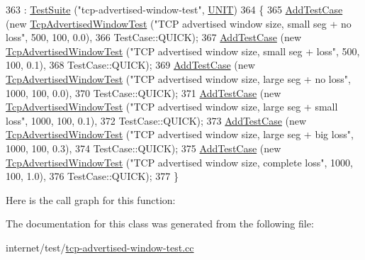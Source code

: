 \begin{DoxyCode}
363                                   : \hyperlink{classns3_1_1TestSuite_a904b0c40583b744d30908aeb94636d1a}{TestSuite} (\textcolor{stringliteral}{"tcp-advertised-window-test"}, 
      \hyperlink{classns3_1_1TestSuite_a1ebfcab34ec8161e085e8e3a1855eae0a3885375a3787abf60431f8454b3cadbd}{UNIT})
364   \{
365     \hyperlink{classns3_1_1TestCase_a3718088e3eefd5d6454569d2e0ddd835}{AddTestCase} (\textcolor{keyword}{new} \hyperlink{classTcpAdvertisedWindowTest}{TcpAdvertisedWindowTest} (\textcolor{stringliteral}{"TCP advertised window
       size, small seg + no loss"}, 500, 100, 0.0),
366                  TestCase::QUICK);
367     \hyperlink{classns3_1_1TestCase_a3718088e3eefd5d6454569d2e0ddd835}{AddTestCase} (\textcolor{keyword}{new} \hyperlink{classTcpAdvertisedWindowTest}{TcpAdvertisedWindowTest} (\textcolor{stringliteral}{"TCP advertised window
       size, small seg + loss"}, 500, 100, 0.1),
368                  TestCase::QUICK);
369     \hyperlink{classns3_1_1TestCase_a3718088e3eefd5d6454569d2e0ddd835}{AddTestCase} (\textcolor{keyword}{new} \hyperlink{classTcpAdvertisedWindowTest}{TcpAdvertisedWindowTest} (\textcolor{stringliteral}{"TCP advertised window
       size, large seg + no loss"}, 1000, 100, 0.0),
370                  TestCase::QUICK);
371     \hyperlink{classns3_1_1TestCase_a3718088e3eefd5d6454569d2e0ddd835}{AddTestCase} (\textcolor{keyword}{new} \hyperlink{classTcpAdvertisedWindowTest}{TcpAdvertisedWindowTest} (\textcolor{stringliteral}{"TCP advertised window
       size, large seg + small loss"}, 1000, 100, 0.1),
372                  TestCase::QUICK);
373     \hyperlink{classns3_1_1TestCase_a3718088e3eefd5d6454569d2e0ddd835}{AddTestCase} (\textcolor{keyword}{new} \hyperlink{classTcpAdvertisedWindowTest}{TcpAdvertisedWindowTest} (\textcolor{stringliteral}{"TCP advertised window
       size, large seg + big loss"}, 1000, 100, 0.3),
374                  TestCase::QUICK);
375     \hyperlink{classns3_1_1TestCase_a3718088e3eefd5d6454569d2e0ddd835}{AddTestCase} (\textcolor{keyword}{new} \hyperlink{classTcpAdvertisedWindowTest}{TcpAdvertisedWindowTest} (\textcolor{stringliteral}{"TCP advertised window
       size, complete loss"}, 1000, 100, 1.0),
376                  TestCase::QUICK);
377   \}
\end{DoxyCode}


Here is the call graph for this function\+:




The documentation for this class was generated from the following file\+:\begin{DoxyCompactItemize}
\item 
internet/test/\hyperlink{tcp-advertised-window-test_8cc}{tcp-\/advertised-\/window-\/test.\+cc}\end{DoxyCompactItemize}

